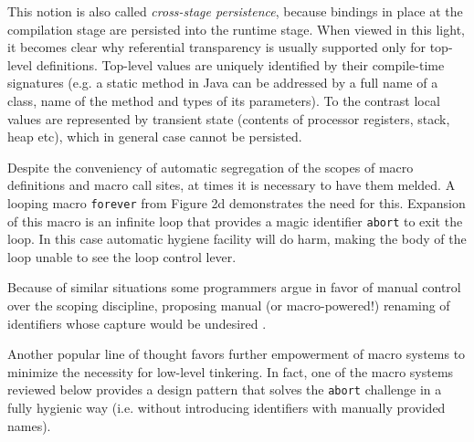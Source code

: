 \documentclass[10pt,journal,a4paper]{IEEEtran}
\begin{document}
This notion is also called \emph{cross-stage persistence}, because bindings in place
at the compilation stage are persisted into the runtime stage. When viewed in this light,
it becomes clear why referential transparency is usually supported only for top-level definitions.
Top-level values are uniquely identified by their compile-time signatures
(e.g. a static method in Java can be addressed by a full name of a class, name of the method and types
of its parameters). To the contrast local values are represented by transient state
(contents of processor registers, stack, heap etc), which in general case cannot be persisted.

Despite the conveniency of automatic segregation of the scopes of macro definitions and macro call sites,
at times it is necessary to have them melded.
A looping macro \small \texttt{forever} \normalsize from Figure 2d demonstrates the need for this.
Expansion of this macro is an infinite loop that provides a magic identifier \small \texttt{abort} \normalsize
to exit the loop. In this case automatic hygiene facility will do harm, making the body of the loop
unable to see the loop control lever.

Because of similar situations some programmers argue in favor of manual control over
the scoping discipline, proposing manual (or macro-powered!) renaming of identifiers whose capture would be
undesired \cite{clinger91a,hoyte08}.

Another popular line of thought favors further empowerment of macro systems
to minimize the necessity for low-level tinkering.
In fact, one of the macro systems reviewed below provides a design pattern \cite{barzilay11}
that solves the \small \texttt{abort} \normalsize challenge in a fully hygienic way (i.e. without introducing
identifiers with manually provided names).
\end{document}
